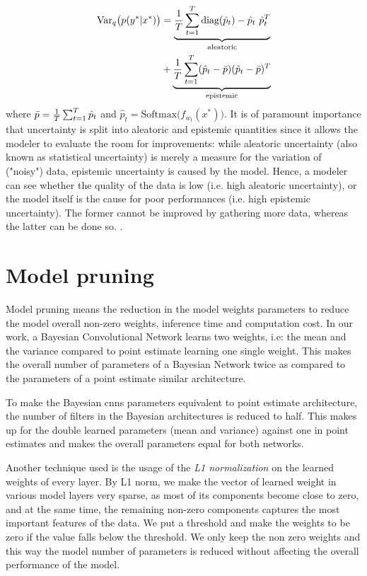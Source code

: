 \begin{equation}
    \begin{aligned}
    \text{Var}_q\big( p(y^*|x^*) \big) &= \underbrace{\frac{1}{T} \sum_{t=1}^T \text{diag}(\hat{p}_t)-\hat{p}_t \ \hat{p}_t^T}_\text{aleatoric} \\ &+ \underbrace{\frac{1}{T}\sum_{t=1}^T (\hat{p}_t - \Bar{p}) (\hat{p}_t - \Bar{p})^T}_\text{epistemic}
    \end{aligned}
\end{equation}
where $\Bar{p} = \frac{1}{T}\sum_{t=1}^T \hat{p}_t$ and $\hat{p}_t = \text{Softmax}\big ( f_{w_{t}}(x^*) \big )$.
\newline It is of paramount importance that uncertainty is split into aleatoric and epistemic quantities since it allows the modeler to evaluate the room for improvements: while aleatoric uncertainty (also known as statistical uncertainty) is merely a measure for the variation of ("noisy") data, epistemic uncertainty is caused by the model. Hence, a modeler can see whether the quality of the data is low (i.e. high aleatoric uncertainty), or the model itself is the cause for poor performances (i.e. high epistemic uncertainty). The former cannot be improved by gathering more data, whereas the latter can be done so. \cite{der2009aleatory} \cite{kendall2017uncertainties}.

\section{Model pruning}

Model pruning means the reduction in the model weights parameters to reduce the model overall non-zero weights, inference time and computation cost. In our work, a Bayesian Convolutional Network learns two weights, i.e: the mean and the variance compared to point estimate learning one single weight. This makes the overall number of parameters of a Bayesian Network twice as compared to the parameters of a point estimate similar architecture.

To make the Bayesian \acp{cnn} parameters equivalent to point estimate architecture, the number of filters in the Bayesian architectures is reduced to half. This makes up for the double learned parameters (mean and variance) against one in point estimates and makes the overall parameters equal for both networks. 

Another technique used is the usage of the \textit{L1 normalization} on the learned weights of every layer.  By L1 norm, we make the vector of learned weight in various model layers very sparse, as most of its components become close to zero, and at the same time, the remaining non-zero components captures the most important features of the data. We put a threshold and make the weights to be zero if the value falls below the threshold. We only keep the non zero weights and this way the model number of parameters is reduced without affecting the overall performance of the model. 

